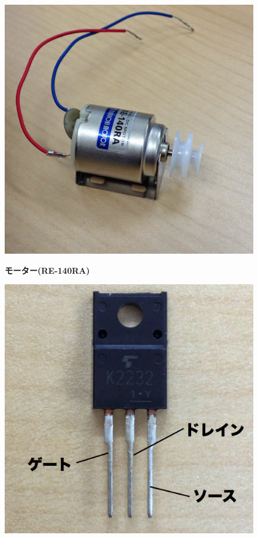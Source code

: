 \documentclass[11pt,a4paper]{jarticle}
\begin{document}
\begin{figure}[h!]
 \begin{minipage}{0.32\columnwidth}
  \centering
  \includegraphics[width=\columnwidth]{img/motor.eps}
  \begin{center}
   \textbf{モーター(RE-140RA)}
  \end{center}
 \end{minipage}
 \begin{minipage}{0.32\columnwidth}
  \centering
  \includegraphics[width=\columnwidth]{img/fet.eps}

\end{minipage}
\end{figure}
\end{document}
